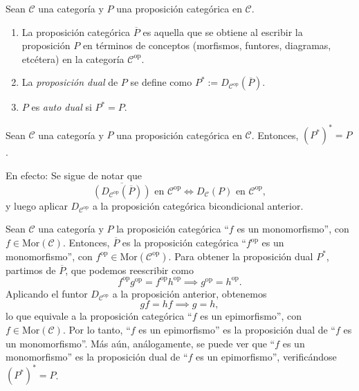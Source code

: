 \documentclass[tesis]{subfiles}
\begin{document}
\begin{Def}
    Sean $\mathscr{C}$ una categoría y $P$ una proposición categórica en $\mathscr{C}$. 

    \begin{enumerate}[label=(\alph*)]
    
        \item La proposición categórica $\overline{P}$ es aquella que se obtiene al escribir la proposición $P$ en términos de conceptos (morfismos, funtores, diagramas, etcétera) en la categoría $\mathscr{C}^\text{op}$.

        \item La \emph{proposición dual} de $P$ se define como $P^\ast:=D_{\mathscr{C}^\text{op}}( \overline{P})$. 


        \item $P$ es \emph{auto dual} si $P^\ast = P$.
    \end{enumerate}
\end{Def}

\begin{Obs}
    Sean $\mathscr{C}$ una categoría y $P$ una proposición categórica en $\mathscr{C}$. Entonces, $(P^\ast)^\ast = P$.
    \vspace{1mm}

    En efecto: Se sigue de notar que
    \[
        \overline{(D_{\mathscr{C}^\text{op}}(\overline{P}))} \text{ en } \mathscr{C}^\text{op} \iff D_\mathscr{C}(P) \text{ en } \mathscr{C}^\text{op},
    \]
    y luego aplicar $D_{\mathscr{C}^\text{op}}$ a la proposición categórica bicondicional anterior.
\end{Obs}

\begin{Ejem}
    Sean $\mathscr{C}$ una categoría y $P$ la proposición categórica ``$f$ es un monomorfismo'', con $f\in\text{Mor}(\mathscr{C})$. Entonces, $ \overline{P}$ es la proposición categórica ``$f^\text{op}$ es un monomorfismo'', con $f^\text{op}\in\text{Mor}(\mathscr{C}^\text{op})$. Para obtener la proposición dual $P^\ast$, partimos de $ \overline{P}$, que podemos reescribir como
    \[
    f^\text{op}g^\text{op} = f^\text{op}h^\text{op} \implies g^\text{op} = h^\text{op}.
    \] 
    Aplicando el funtor $D_{\mathscr{C}^\text{op}}$ a la proposición anterior, obtenemos
    \[
    gf = hf \implies g=h,
    \] 
    lo que equivale a la proposición categórica ``$f$ es un epimorfismo'', con $f\in\text{Mor}(\mathscr{C})$. Por lo tanto, ``$f$ es un epimorfismo'' es la proposición dual de ``$f$ es un monomorfismo''. Más aún, análogamente, se puede ver que ``$f$ es un monomorfismo'' es la proposición dual de ``$f$ es un epimorfismo'', verificándose $(P^\ast)^\ast = P$.
\end{Ejem}
\end{document}
